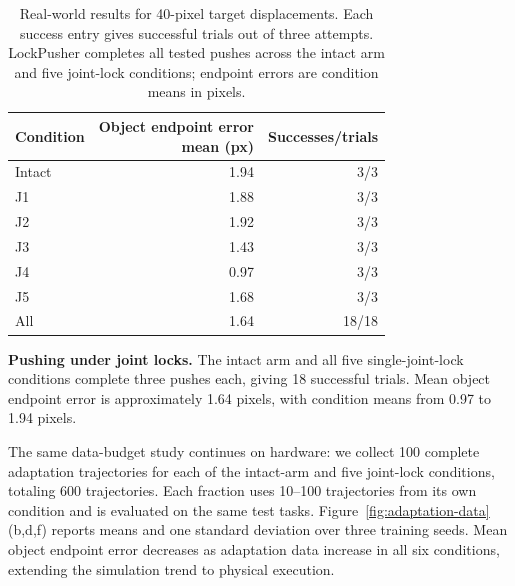 \begin{table}[!tbp]\centering\small

\begin{tabular}{lrr}\toprule
Condition & \shortstack{Object endpoint error\\mean (px)} & Successes/trials\\\midrule
Intact &1.94&3/3\\
J1 &1.88&3/3\\
J2 &1.92&3/3\\
J3 &1.43&3/3\\
J4 &0.97&3/3\\
J5 &1.68&3/3\\
\midrule All &1.64&18/18\\\bottomrule
\end{tabular}\caption{Real-world results for 40-pixel target displacements. Each success entry gives successful trials out of three attempts. LockPusher completes all tested pushes across the intact arm and five joint-lock conditions; endpoint errors are condition means in pixels.}
\label{tab:hardware-scores}
\end{table}


\noindent\hspace*{1em}\textbf{Pushing under joint locks.} The intact arm and all five single-joint-lock conditions complete three pushes each, giving 18 successful trials. Mean object endpoint error is approximately 1.64 pixels, with condition means from 0.97 to 1.94 pixels. 

The same data-budget study continues on hardware: we collect 100 complete adaptation trajectories for each of the intact-arm and five joint-lock conditions, totaling 600 trajectories. Each fraction uses 10--100 trajectories from its own condition and is evaluated on the same test tasks. Figure~\ref{fig:adaptation-data}(b,d,f) reports means and one standard deviation over three training seeds. Mean object endpoint error decreases as adaptation data increase in all six conditions, extending the simulation trend to physical execution. 


